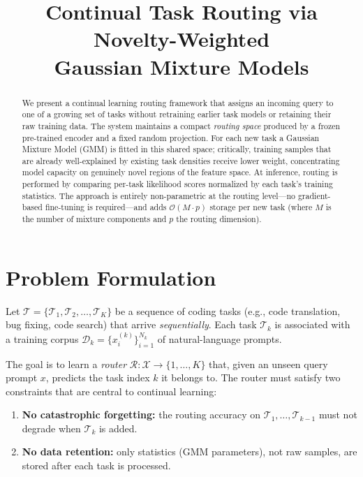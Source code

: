 \documentclass[12pt,a4paper]{article}
\title{\textbf{Continual Task Routing via Novelty-Weighted\\Gaussian Mixture Models}}
\author{}
\date{}
\begin{document}
\maketitle

\begin{abstract}
We present a continual learning routing framework that assigns an incoming query to one of a growing set of tasks without retraining earlier task models or retaining their raw training data.
The system maintains a compact \emph{routing space} produced by a frozen pre-trained encoder and a fixed random projection.
For each new task a Gaussian Mixture Model (GMM) is fitted in this shared space; critically, training samples that are already well-explained by existing task densities receive lower weight, concentrating model capacity on genuinely novel regions of the feature space.
At inference, routing is performed by comparing per-task likelihood scores normalized by each task's training statistics.
The approach is entirely non-parametric at the routing level---no gradient-based fine-tuning is required---and adds $\mathcal{O}(M \cdot p)$ storage per new task (where $M$ is the number of mixture components and $p$ the routing dimension).
\end{abstract}

\section{Problem Formulation}
\label{sec:problem}

Let $\mathcal{T} = \{\mathcal{T}_1, \mathcal{T}_2, \ldots, \mathcal{T}_K\}$ be a sequence of coding tasks (e.g., code translation, bug fixing, code search) that arrive \emph{sequentially}.
Each task $\mathcal{T}_k$ is associated with a training corpus $\mathcal{D}_k = \{x_i^{(k)}\}_{i=1}^{N_k}$ of natural-language prompts.

The goal is to learn a \emph{router} $\mathcal{R} : \mathcal{X} \to \{1,\ldots,K\}$ that, given an unseen query prompt $x$, predicts the task index $k$ it belongs to. The router must satisfy two constraints that are central to continual learning:

\begin{enumerate}[noitemsep]
    \item \textbf{No catastrophic forgetting:} the routing accuracy on $\mathcal{T}_1,\ldots,\mathcal{T}_{k-1}$ must not degrade when $\mathcal{T}_k$ is added.
    \item \textbf{No data retention:} only statistics (GMM parameters), not raw samples, are stored after each task is processed.
\end{enumerate}
\end{document}
